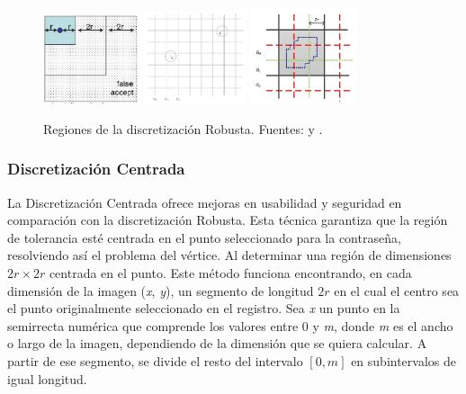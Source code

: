 		\begin{figure}[H]
			\centering
			\includegraphics[width=0.25\textwidth]{image4.jpg}
			\includegraphics[width=0.27\textwidth]{image2.png}
			\includegraphics[width=0.28\textwidth]{image3.png}
			\caption{Regiones de la discretizaci\'on Robusta. Fuentes: \cite{zhu2013security} y \cite{chiasson2008centered}.}
		\end{figure}
	
\subsubsection{Discretización Centrada}
	
La Discretización Centrada \cite{chiasson2008centered} ofrece mejoras en usabilidad y seguridad en comparación con la discretización Robusta. Esta técnica garantiza que la región de tolerancia esté centrada en el punto seleccionado para la contraseña, resolviendo así el problema del vértice. Al determinar una región de dimensiones \(2r \times 2r\) centrada en el punto. Este método funciona encontrando, en cada dimensión de la imagen (\textit{x}, \textit{y}), un segmento de longitud \(2r\) en el cual el centro sea el punto originalmente seleccionado en el registro. Sea \textit{x} un punto en la semirrecta numérica que comprende los valores entre 0 y \textit{m}, donde \textit{m} es el ancho o largo de la imagen, dependiendo de la dimensión que se quiera calcular. A partir de ese segmento, se divide el resto del intervalo $[0, m]$ en subintervalos de igual longitud.

